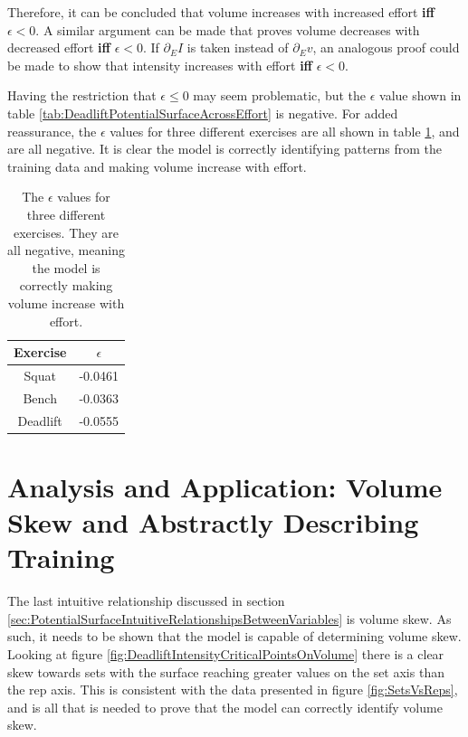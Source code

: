 Therefore, it can be concluded that volume increases with increased effort \textbf{iff} $\epsilon< 0$. A similar argument can be made that proves volume decreases with decreased effort \textbf{iff} $\epsilon< 0$. If $\partial_E I$ is taken instead of $\partial_E v$, an analogous proof could be made to show that intensity increases with effort \textbf{iff} $\epsilon<0$.

Having the restriction that $\epsilon\le 0$ may seem problematic, but the $\epsilon$ value shown in table \ref{tab:DeadliftPotentialSurfaceAcrossEffort} is negative. For added reassurance, the $\epsilon$ values for three different exercises are all shown in table \ref{tab:EpsilonAcrossExercies}, and are all negative. It is clear the model is correctly identifying patterns from the training data and making volume increase with effort.

\begin{table}[h]
    \centering
    \begin{tabular}{c|c}
        Exercise & $\epsilon$ \\
        \hline
        Squat & -0.0461\\
        Bench & -0.0363\\
        Deadlift & -0.0555\\
    \end{tabular}
    \caption{The $\epsilon$ values for three different exercises. They are all negative, meaning the model is correctly making volume increase with effort.}
    \label{tab:EpsilonAcrossExercies}
\end{table}

\section{Analysis and Application: Volume Skew and Abstractly Describing Training}
\label{sec:PotentialSurfaceAbstractlyDescribingTraining}

The last intuitive relationship discussed in section \ref{sec:PotentialSurfaceIntuitiveRelationshipsBetweenVariables} is volume skew. As such, it needs to be shown that the model is capable of determining volume skew. Looking at figure \ref{fig:DeadliftIntensityCriticalPointsOnVolume} there is a clear skew towards sets with the surface reaching greater values on the set axis than the rep axis. This is consistent with the data presented in figure \ref{fig:SetsVsReps}, and is all that is needed to prove that the model can correctly identify volume skew.

